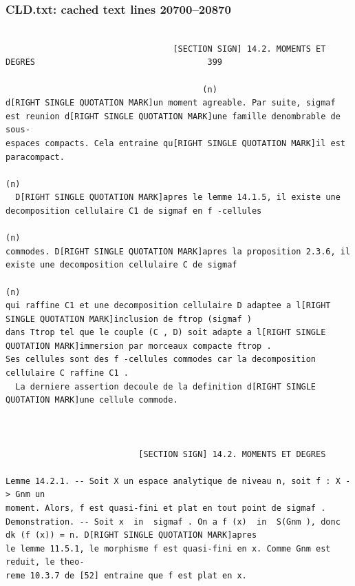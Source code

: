 \documentclass[
  11pt,
]{article}
\begin{document}
\subsubsection{CLD.txt: cached text lines
20700--20870}\label{cld.txt-cached-text-lines-2070020870}

\begin{lstlisting}

                                  [SECTION SIGN] 14.2. MOMENTS ET DEGRES                                   399

                                        (n)
d[RIGHT SINGLE QUOTATION MARK]un moment agreable. Par suite, sigmaf est reunion d[RIGHT SINGLE QUOTATION MARK]une famille denombrable de sous-
espaces compacts. Cela entraine qu[RIGHT SINGLE QUOTATION MARK]il est paracompact.
                                                                         (n)
  D[RIGHT SINGLE QUOTATION MARK]apres le lemme 14.1.5, il existe une decomposition cellulaire C1 de sigmaf en f -cellules
                                                                                               (n)
commodes. D[RIGHT SINGLE QUOTATION MARK]apres la proposition 2.3.6, il existe une decomposition cellulaire C de sigmaf
                                                                                              (n)
qui raffine C1 et une decomposition cellulaire D adaptee a l[RIGHT SINGLE QUOTATION MARK]inclusion de ftrop (sigmaf )
dans Ttrop tel que le couple (C , D) soit adapte a l[RIGHT SINGLE QUOTATION MARK]immersion par morceaux compacte ftrop .
Ses cellules sont des f -cellules commodes car la decomposition cellulaire C raffine C1 .
  La derniere assertion decoule de la definition d[RIGHT SINGLE QUOTATION MARK]une cellule commode.



                           [SECTION SIGN] 14.2. MOMENTS ET DEGRES

Lemme 14.2.1. -- Soit X un espace analytique de niveau n, soit f : X -> Gnm un
moment. Alors, f est quasi-fini et plat en tout point de sigmaf .
Demonstration. -- Soit x  in  sigmaf . On a f (x)  in  S(Gnm ), donc dk (f (x)) = n. D[RIGHT SINGLE QUOTATION MARK]apres
le lemme 11.5.1, le morphisme f est quasi-fini en x. Comme Gnm est reduit, le theo-
reme 10.3.7 de [52] entraine que f est plat en x.


\end{lstlisting}
\end{document}
